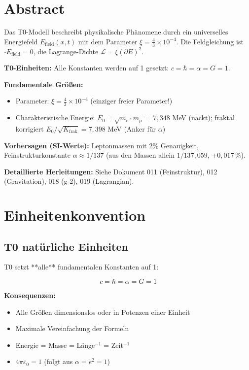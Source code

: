 \section*{Abstract}
		Das T0-Modell beschreibt physikalische Phänomene durch ein universelles Energiefeld $E_{\text{field}}(x,t)$ mit dem Parameter $\xi = \frac{4}{3} \times 10^{-4}$. Die Feldgleichung ist $\square E_{\text{field}} = 0$, die Lagrange-Dichte $\mathcal{L} = \xi (\partial E)^2$. 
		
		\textbf{T0-Einheiten:} Alle Konstanten werden auf 1 gesetzt: $c = \hbar = \alpha = G = 1$.
		
		\textbf{Fundamentale Größen:}
		\begin{itemize}
			\item Parameter: $\xi = \frac{4}{3} \times 10^{-4}$ (einziger freier Parameter!)
			\item Charakteristische Energie: $E_0 = \sqrt{m_e \cdot m_\mu} = 7{,}348$ MeV (nackt); fraktal korrigiert $E_0/\sqrt{K_{\text{frak}}} = 7{,}398$ MeV (Anker für $\alpha$)
		\end{itemize}
		
		\textbf{Vorhersagen (SI-Werte):} Leptonmassen mit 2\% Genauigkeit, Feinstrukturkonstante $\alpha \approx 1/137$ (aus den Massen allein $1/137{,}059$, $+0{,}017\,\%$).
		
		\textbf{Detaillierte Herleitungen:} Siehe Dokument 011 (Feinstruktur), 012 (Gravitation), 018 (g-2), 019 (Lagrangian).

	
	
	
	\section{Einheitenkonvention}
	\label{sec:units}
	
	\subsection{T0 natürliche Einheiten}
	
	T0 setzt **alle** fundamentalen Konstanten auf 1:
	
	\begin{equation}
		\boxed{c = \hbar = \alpha = G = 1}
	\end{equation}
	
	\textbf{Konsequenzen:}
	\begin{itemize}
		\item Alle Größen dimensionslos oder in Potenzen einer Einheit
		\item Maximale Vereinfachung der Formeln
		\item Energie = Masse = Länge$^{-1}$ = Zeit$^{-1}$
		\item $4\pi\varepsilon_0 = 1$ (folgt aus $\alpha = e^2 = 1$)
	\end{itemize}
	

